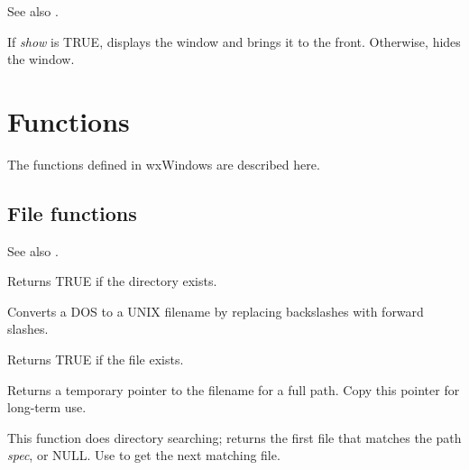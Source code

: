 See also .



If {\it show} is TRUE, displays the window and brings it to the front.  Otherwise,
hides the window.

\chapter{Functions}\label{functions}
%
\setfooter{\thepage}{}{}{}{}{\thepage}

The functions defined in wxWindows are described here.

\section{File functions}\label{filefunctions}

See also .



Returns TRUE if the directory exists.



Converts a DOS to a UNIX filename by replacing backslashes with forward
slashes.



Returns TRUE if the file exists.



Returns a temporary pointer to the filename for a full path.
Copy this pointer for long-term use.

\label{wxfindfirstfile}


This function does directory searching; returns the first file
that matches the path {\it spec}, or NULL. Use  to
get the next matching file.

